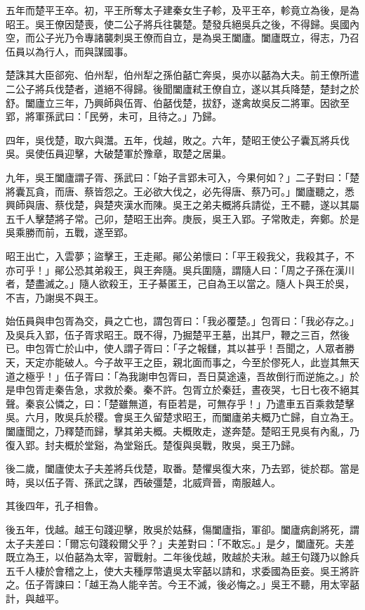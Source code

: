 \begin{pinyinscope}
五年而楚平王卒。初，平王所奪太子建秦女生子軫，及平王卒，軫竟立為後，是為昭王。吳王僚因楚喪，使二公子將兵往襲楚。楚發兵絕吳兵之後，不得歸。吳國內空，而公子光乃令專諸襲刺吳王僚而自立，是為吳王闔廬。闔廬既立，得志，乃召伍員以為行人，而與謀國事。

楚誅其大臣郤宛、伯州犁，伯州犁之孫伯嚭亡奔吳，吳亦以嚭為大夫。前王僚所遣二公子將兵伐楚者，道絕不得歸。後聞闔廬弒王僚自立，遂以其兵降楚，楚封之於舒。闔廬立三年，乃興師與伍胥、伯嚭伐楚，拔舒，遂禽故吳反二將軍。因欲至郢，將軍孫武曰：「民勞，未可，且待之。」乃歸。

四年，吳伐楚，取六與灊。五年，伐越，敗之。六年，楚昭王使公子囊瓦將兵伐吳。吳使伍員迎擊，大破楚軍於豫章，取楚之居巢。

九年，吳王闔廬謂子胥、孫武曰：「始子言郢未可入，今果何如？」二子對曰：「楚將囊瓦貪，而唐、蔡皆怨之。王必欲大伐之，必先得唐、蔡乃可。」闔廬聽之，悉興師與唐、蔡伐楚，與楚夾漢水而陳。吳王之弟夫概將兵請從，王不聽，遂以其屬五千人擊楚將子常。己卯，楚昭王出奔。庚辰，吳王入郢。子常敗走，奔鄭。於是吳乘勝而前，五戰，遂至郢。

昭王出亡，入雲夢；盜擊王，王走鄖。鄖公弟懷曰：「平王殺我父，我殺其子，不亦可乎！」鄖公恐其弟殺王，與王奔隨。吳兵圍隨，謂隨人曰：「周之子孫在漢川者，楚盡滅之。」隨人欲殺王，王子綦匿王，己自為王以當之。隨人卜與王於吳，不吉，乃謝吳不與王。

始伍員與申包胥為交，員之亡也，謂包胥曰：「我必覆楚。」包胥曰：「我必存之。」及吳兵入郢，伍子胥求昭王。既不得，乃掘楚平王墓，出其尸，鞭之三百，然後已。申包胥亡於山中，使人謂子胥曰：「子之報讎，其以甚乎！吾聞之，人眾者勝天，天定亦能破人。今子故平王之臣，親北面而事之，今至於僇死人，此豈其無天道之極乎！」伍子胥曰：「為我謝申包胥曰，吾日莫途遠，吾故倒行而逆施之。」於是申包胥走秦告急，求救於秦。秦不許。包胥立於秦廷，晝夜哭，七日七夜不絕其聲。秦哀公憐之，曰：「楚雖無道，有臣若是，可無存乎！」乃遣車五百乘救楚擊吳。六月，敗吳兵於稷。會吳王久留楚求昭王，而闔廬弟夫概乃亡歸，自立為王。闔廬聞之，乃釋楚而歸，擊其弟夫概。夫概敗走，遂奔楚。楚昭王見吳有內亂，乃復入郢。封夫概於堂谿，為堂谿氏。楚復與吳戰，敗吳，吳王乃歸。

後二歲，闔廬使太子夫差將兵伐楚，取番。楚懼吳復大來，乃去郢，徙於鄀。當是時，吳以伍子胥、孫武之謀，西破彊楚，北威齊晉，南服越人。

其後四年，孔子相魯。

後五年，伐越。越王句踐迎擊，敗吳於姑蘇，傷闔廬指，軍卻。闔廬病創將死，謂太子夫差曰：「爾忘句踐殺爾父乎？」夫差對曰：「不敢忘。」是夕，闔廬死。夫差既立為王，以伯嚭為太宰，習戰射。二年後伐越，敗越於夫湫。越王句踐乃以餘兵五千人棲於會稽之上，使大夫種厚幣遺吳太宰嚭以請和，求委國為臣妾。吳王將許之。伍子胥諫曰：「越王為人能辛苦。今王不滅，後必悔之。」吳王不聽，用太宰嚭計，與越平。


\end{pinyinscope}
